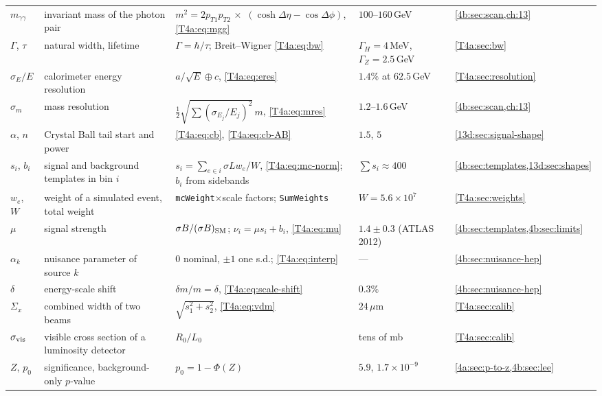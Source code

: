 \begin{small}
\begin{xltabular}{\linewidth}{>{\raggedright\arraybackslash}p{1.5cm} >{\raggedright\arraybackslash}X >{\raggedright\arraybackslash}p{3.6cm} >{\raggedright\arraybackslash}p{2.6cm} >{\raggedright\arraybackslash}p{2.0cm}}
$m_{\gamma\gamma}$ & invariant mass of the photon pair & $m^2=2p_{T1}p_{T2}\,\times$ $(\cosh\Delta\eta-\cos\Delta\phi)$, \eqref{T4a:eq:mgg} & $100$--$160$\,GeV & \cref{4b:sec:scan,ch:13} \\
$\Gamma$, $\tau$ & natural width, lifetime & $\Gamma=\hbar/\tau$; Breit--Wigner \eqref{T4a:eq:bw} & $\Gamma_H=4$\,MeV, $\Gamma_Z=2.5$\,GeV & \cref{T4a:sec:bw} \\
$\sigma_E/E$ & calorimeter energy resolution & $a/\sqrt E\oplus c$, \eqref{T4a:eq:eres} & $1.4\%$ at $62.5$\,GeV & \cref{T4a:sec:resolution} \\
$\sigma_m$ & mass resolution & $\frac12\sqrt{\sum(\sigma_{E_j}/E_j)^2}\,m$, \eqref{T4a:eq:mres} & $1.2$--$1.6$\,GeV & \cref{4b:sec:scan,ch:13} \\
$\alpha$, $n$ & Crystal Ball tail start and power & \eqref{T4a:eq:cb}, \eqref{T4a:eq:cb-AB} & $1.5$, $5$ & \cref{13d:sec:signal-shape} \\
$s_i$, $b_i$ & signal and background templates in bin $i$ & $s_i=\sum_{e\in i}\sigma Lw_e/W$, \eqref{T4a:eq:mc-norm}; $b_i$ from sidebands & $\sum s_i\approx400$ & \cref{4b:sec:templates,13d:sec:shapes} \\
$w_e$, $W$ & weight of a simulated event, total weight & \texttt{mcWeight}$\times$scale factors; \texttt{SumWeights} & $W=5.6\times10^7$ & \cref{T4a:sec:weights} \\
$\mu$ & signal strength & $\sigma B/(\sigma B)_{\rm SM}$; $\nu_i=\mu s_i+b_i$, \eqref{T4a:eq:mu} & $1.4\pm0.3$ (ATLAS 2012) & \cref{4b:sec:templates,4b:sec:limits} \\
$\alpha_k$ & nuisance parameter of source $k$ & $0$ nominal, $\pm1$ one s.d.; \eqref{T4a:eq:interp} & --- & \cref{4b:sec:nuisance-hep} \\
$\delta$ & energy-scale shift & $\delta m/m=\delta$, \eqref{T4a:eq:scale-shift} & $0.3\%$ & \cref{4b:sec:nuisance-hep} \\
$\Sigma_x$ & combined width of two beams & $\sqrt{s_1^2+s_2^2}$, \eqref{T4a:eq:vdm} & $24\,\mu$m & \cref{T4a:sec:calib} \\
$\sigma_{\rm vis}$ & visible cross section of a luminosity detector & $R_0/L_0$ & tens of mb & \cref{T4a:sec:calib} \\
$Z$, $p_0$ & significance, background-only $p$-value & $p_0=1-\Phi(Z)$ & $5.9$, $1.7\times10^{-9}$ & \cref{4a:sec:p-to-z,4b:sec:lee} \\
\end{xltabular}
\end{small}

